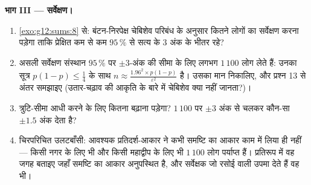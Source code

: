 \begin{problem}
\medskip
\noindent\textbf{भाग III --- सर्वेक्षण।}
\begin{enumerate}[resume]
  \item \cref{exo:g12:sums:8} से: बंटन-निरपेक्ष चेबिशेव परिबंध के अनुसार कितने लोगों का
        सर्वेक्षण करना पड़ेगा ताकि प्रेक्षित  कम से कम
        $95\,\%$  से सत्य के $3$ अंक के भीतर रहे?
  \item असली सर्वेक्षण संस्थान $95\,\%$ पर $\pm 3$-अंक की सीमा के लिए लगभग $1\,100$
        लोग लेते हैं: उनका सूत्र $p(1-p) \leq \frac14$ के साथ $n \approx \frac{1.96^2 \times p(1-p)}
        {\varepsilon^2}$ है। उसका मान निकालिए,
        और प्रश्न 13 से अंतर समझाइए (उतार-चढ़ाव की आकृति के बारे में चेबिशेव
        क्या नहीं जानता?)।
  \item त्रुटि-सीमा आधी करने के लिए  कितना बढ़ाना पड़ेगा? $1\,100$ पर
        $\pm 3$ अंक से चलकर कौन-सा  $\pm 1.5$ अंक देता है?
  \item चिरपरिचित उलटबाँसी: आवश्यक प्रतिदर्श-आकार ने कभी समष्टि का आकार काम
        में लिया ही नहीं --- किसी नगर के लिए भी और किसी महाद्वीप के लिए भी
        $1\,100$ लोग पर्याप्त हैं। प्रतिरूप में वह जगह बताइए जहाँ समष्टि का
        आकार अनुपस्थित है, और सर्वेक्षक जो रसोई वाली उपमा देते हैं वह भी।
\end{enumerate}


\end{problem}
